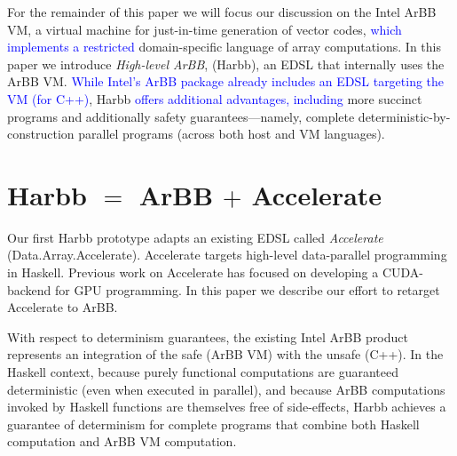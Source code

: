 \documentclass[conference]{IEEEtran}
\newcommand{\new}[1]{\textcolor{blue}{#1}}
\newcommand{\new}[1]{#1}
\newcommand{\systemname}[0]{{Harbb}}
\newcommand{\accarbb}[0]{\systemname{}}
\begin{document}
{For the remainder of this paper we will focus our discussion
  on the Intel ArBB VM, a virtual machine for just-in-time
  generation of vector codes, \new{which implements a restricted} domain-specific
  language of array computations.  In this paper we introduce
  {\em High-level ArBB}, 
  (\systemname{}), an EDSL that internally uses the ArBB
  VM.  \new{While Intel's ArBB package already includes an EDSL targeting the VM (for C++)},
\systemname{} \new{offers additional advantages, including}
  more succinct programs and additionally safety
  guarantees---namely, complete deterministic-by-construction parallel
  programs (across both host and VM languages).}


\section{\accarbb{} $=$ ArBB $+$ Accelerate}
\label{sec:accelerate-arbb}

Our first \systemname{} prototype adapts an existing EDSL called {\em
  Accelerate} (Data.Array.Accelerate).  Accelerate targets high-level
data-parallel programming in Haskell.
Previous work on Accelerate has focused on developing a CUDA-backend
for GPU programming.  In this paper we describe our effort to retarget
Accelerate to ArBB.  

With respect to determinism guarantees, the existing Intel ArBB product
represents an integration of the safe (ArBB VM) with the unsafe (C++).
In the Haskell context, because purely functional computations are
guaranteed deterministic (even when executed in parallel), and because
ArBB computations invoked by Haskell functions are themselves free of
side-effects, \systemname{} achieves a
guarantee of determinism for complete programs that combine both
Haskell computation and ArBB VM computation.
\end{document}
